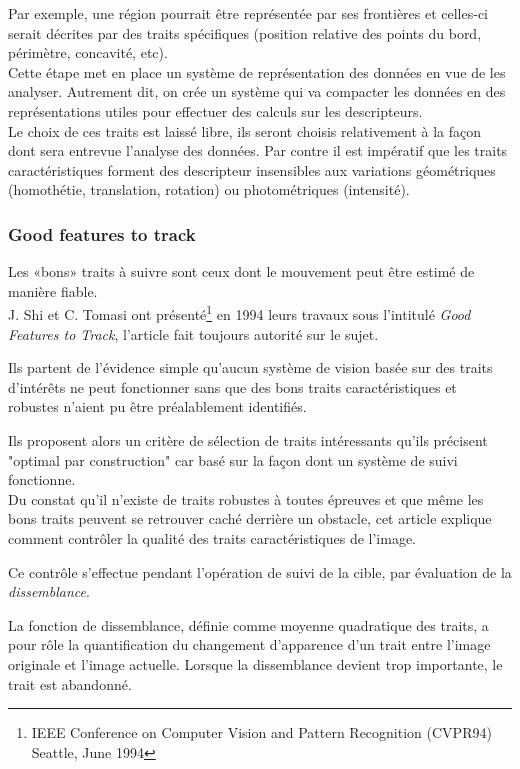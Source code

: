 \documentclass[a4paper,11pt]{report}
\begin{document}
Par exemple, une région pourrait être représentée par ses frontières et celles-ci serait décrites par des traits spécifiques (position relative des points du bord, périmètre, concavité, etc).
\\

Cette étape met en place un système de représentation des données en vue de les analyser. Autrement dit, on crée un système qui va compacter les données en des représentations utiles pour effectuer des calculs sur les descripteurs.\\

Le choix de ces traits est laissé libre, ils seront choisis relativement à la façon dont sera entrevue l'analyse des données. Par contre il est impératif que les traits caractéristiques forment des descripteur insensibles aux variations géométriques (homothétie, translation, rotation) ou photométriques (intensité).   
\subsubsection{Good features to track}
Les «bons» traits à suivre sont ceux dont le mouvement peut être estimé de manière fiable.\\

J. Shi et C. Tomasi ont présenté\footnote{IEEE Conference on Computer Vision and Pattern Recognition (CVPR94) Seattle, June 1994} en 1994 leurs travaux sous l'intitulé \textit{Good Features to Track}, l'article fait toujours autorité sur le sujet. 

Ils partent de l'évidence simple qu'aucun système de vision basée sur des traits d'intérêts ne peut fonctionner sans que des bons traits caractéristiques et robustes n'aient pu être préalablement identifiés. 

Ils proposent alors un critère de sélection de traits intéressants qu'ils précisent "optimal par construction" car basé sur la façon dont un système de suivi fonctionne.\\

Du constat qu'il n'existe de traits robustes à toutes épreuves et que même les bons traits peuvent se retrouver caché derrière un obstacle, cet article explique comment contrôler la qualité des traits caractéristiques de l'image.

Ce contrôle s'effectue pendant l'opération de suivi de la cible, par évaluation de la \textit{dissemblance}. 

La fonction de dissemblance, définie comme moyenne quadratique des traits, a pour rôle la quantification du changement d'apparence d'un trait entre l'image originale et l'image actuelle. Lorsque la dissemblance devient trop importante, le trait est abandonné.\\
\end{document}
